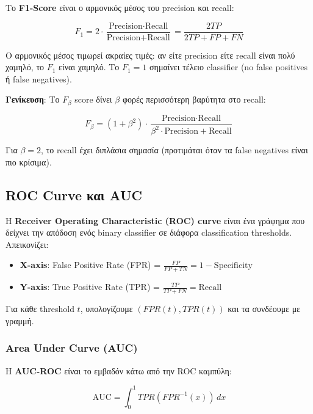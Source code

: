 \documentclass[12pt,a4paper,twoside]{book}
\begin{document}
Το \textbf{F1-Score} είναι ο αρμονικός μέσος του precision και recall:

\begin{equation}
    F_1 = 2 \cdot \frac{\text{Precision} \cdot \text{Recall}}{\text{Precision} + \text{Recall}} = \frac{2 TP}{2 TP + FP + FN}
\end{equation}

Ο αρμονικός μέσος τιμωρεί ακραίες τιμές: αν είτε precision είτε recall είναι πολύ χαμηλό, το \(F_1\) είναι χαμηλό. Το \(F_1 = 1\) σημαίνει τέλειο classifier (no false positives ή false negatives).

\textbf{Γενίκευση}: Το \(F_\beta\) score δίνει \(\beta\) φορές περισσότερη βαρύτητα στο recall:

\begin{equation}
    F_\beta = (1 + \beta^2) \cdot \frac{\text{Precision} \cdot \text{Recall}}{\beta^2 \cdot \text{Precision} + \text{Recall}}
\end{equation}

Για \(\beta = 2\), το recall έχει διπλάσια σημασία (προτιμάται όταν τα false negatives είναι πιο κρίσιμα).

\subsection{ROC Curve και AUC}

Η \textbf{Receiver Operating Characteristic (ROC) curve} είναι ένα γράφημα που δείχνει την απόδοση ενός binary classifier σε διάφορα classification thresholds. Απεικονίζει:

\begin{itemize}
    \item \textbf{X-axis}: False Positive Rate (FPR) = \(\frac{FP}{FP + TN} = 1 - \text{Specificity}\)
    \item \textbf{Y-axis}: True Positive Rate (TPR) = \(\frac{TP}{TP + FN} = \text{Recall}\)
\end{itemize}

Για κάθε threshold \(t\), υπολογίζουμε \((FPR(t), TPR(t))\) και τα συνδέουμε με γραμμή.
\subsubsection*{Area Under Curve (AUC)}

Η \textbf{AUC-ROC} είναι το εμβαδόν κάτω από την ROC καμπύλη:

\begin{equation}
    \text{AUC} = \int_0^1 TPR(FPR^{-1}(x)) \, dx
\end{equation}
\end{document}
